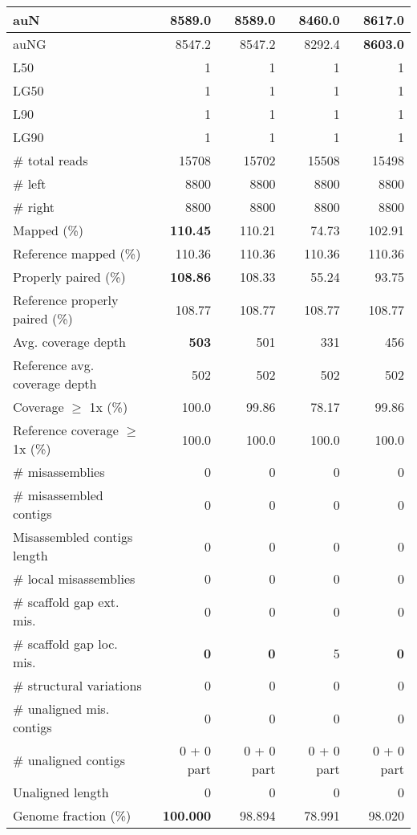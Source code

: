 \documentclass[12pt,a4paper]{article}
\begin{document}
\begin{table}[ht]
\begin{center}
\begin{tabular}{|l*{4}{|r}|}
auN & 8589.0 & 8589.0 & 8460.0 & {\bf 8617.0} \\ \hline
auNG & 8547.2 & 8547.2 & 8292.4 & {\bf 8603.0} \\ \hline
L50 & 1 & 1 & 1 & 1 \\ \hline
LG50 & 1 & 1 & 1 & 1 \\ \hline
L90 & 1 & 1 & 1 & 1 \\ \hline
LG90 & 1 & 1 & 1 & 1 \\ \hline
\# total reads & 15708 & 15702 & 15508 & 15498 \\ \hline
\# left & 8800 & 8800 & 8800 & 8800 \\ \hline
\# right & 8800 & 8800 & 8800 & 8800 \\ \hline
Mapped (\%) & {\bf 110.45} & 110.21 & 74.73 & 102.91 \\ \hline
Reference mapped (\%) & 110.36 & 110.36 & 110.36 & 110.36 \\ \hline
Properly paired (\%) & {\bf 108.86} & 108.33 & 55.24 & 93.75 \\ \hline
Reference properly paired (\%) & 108.77 & 108.77 & 108.77 & 108.77 \\ \hline
Avg. coverage depth & {\bf 503} & 501 & 331 & 456 \\ \hline
Reference avg. coverage depth & 502 & 502 & 502 & 502 \\ \hline
Coverage $\geq$ 1x (\%) & 100.0 & 99.86 & 78.17 & 99.86 \\ \hline
Reference coverage $\geq$ 1x (\%) & 100.0 & 100.0 & 100.0 & 100.0 \\ \hline
\# misassemblies & 0 & 0 & 0 & 0 \\ \hline
\# misassembled contigs & 0 & 0 & 0 & 0 \\ \hline
Misassembled contigs length & 0 & 0 & 0 & 0 \\ \hline
\# local misassemblies & 0 & 0 & 0 & 0 \\ \hline
\# scaffold gap ext. mis. & 0 & 0 & 0 & 0 \\ \hline
\# scaffold gap loc. mis. & {\bf 0} & {\bf 0} & 5 & {\bf 0} \\ \hline
\# structural variations & 0 & 0 & 0 & 0 \\ \hline
\# unaligned mis. contigs & 0 & 0 & 0 & 0 \\ \hline
\# unaligned contigs & 0 + 0 part & 0 + 0 part & 0 + 0 part & 0 + 0 part \\ \hline
Unaligned length & 0 & 0 & 0 & 0 \\ \hline
Genome fraction (\%) & {\bf 100.000} & 98.894 & 78.991 & 98.020 \\ \hline

\end{tabular}
\end{center}
\end{table}
\end{document}
